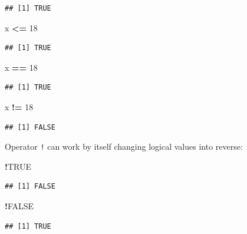 \documentclass[
]{book}
\newenvironment{Shaded}{\begin{snugshade}}{\end{snugshade}}
\newcommand{\DecValTok}[1]{\textcolor[rgb]{0.00,0.00,0.81}{#1}}
\newcommand{\NormalTok}[1]{#1}
\newcommand{\OperatorTok}[1]{\textcolor[rgb]{0.81,0.36,0.00}{\textbf{#1}}}
\newcommand{\OtherTok}[1]{\textcolor[rgb]{0.56,0.35,0.01}{#1}}
\newcommand{\StringTok}[1]{\textcolor[rgb]{0.31,0.60,0.02}{#1}}
\begin{document}
\begin{verbatim}
## [1] TRUE
\end{verbatim}

\begin{Shaded}
\begin{Highlighting}[]
\NormalTok{x }\OperatorTok{<=}\StringTok{ }\DecValTok{18}
\end{Highlighting}
\end{Shaded}

\begin{verbatim}
## [1] TRUE
\end{verbatim}

\begin{Shaded}
\begin{Highlighting}[]
\NormalTok{x }\OperatorTok{==}\StringTok{ }\DecValTok{18}
\end{Highlighting}
\end{Shaded}

\begin{verbatim}
## [1] TRUE
\end{verbatim}

\begin{Shaded}
\begin{Highlighting}[]
\NormalTok{x }\OperatorTok{!=}\StringTok{ }\DecValTok{18}
\end{Highlighting}
\end{Shaded}

\begin{verbatim}
## [1] FALSE
\end{verbatim}

Operator \texttt{!} can work by itself changing logical values into reverse:

\begin{Shaded}
\begin{Highlighting}[]
\OperatorTok{!}\OtherTok{TRUE}
\end{Highlighting}
\end{Shaded}

\begin{verbatim}
## [1] FALSE
\end{verbatim}

\begin{Shaded}
\begin{Highlighting}[]
\OperatorTok{!}\OtherTok{FALSE}
\end{Highlighting}
\end{Shaded}

\begin{verbatim}
## [1] TRUE
\end{verbatim}
\end{document}
